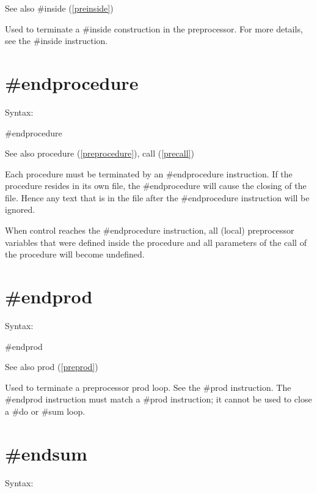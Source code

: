 \noindent See also \#inside (\ref{preinside})

\noindent Used to terminate a \#inside construction in 
the preprocessor. For more details, see the \#inside 
instruction.


\section{\#endprocedure}
\label{preendprocedure}

\noindent Syntax:

\#endprocedure
 
\noindent See also procedure (\ref{preprocedure}), call
(\ref{precall})

\noindent Each procedure must be terminated by an 
\#endprocedure instruction. If the procedure resides 
in its own file, the \#endprocedure will cause the closing of the file. 
Hence any text that is in the file after the \#endprocedure instruction 
will be ignored.

When control reaches the \#endprocedure instruction, all (local) 
preprocessor variables that were defined 
inside the procedure and all parameters of the call of the procedure will 
become undefined.

 
\section{\#endprod}
\label{preendprod}

\noindent Syntax:

\#endprod
 
\noindent See also prod (\ref{preprod})

\noindent Used to terminate a preprocessor 
prod loop. See the \#prod instruction. The 
\#endprod instruction must match a \#prod instruction; it cannot be used to 
close a \#do or \#sum loop.

 
\section{\#endsum}
\label{preendsum}

\noindent Syntax:

